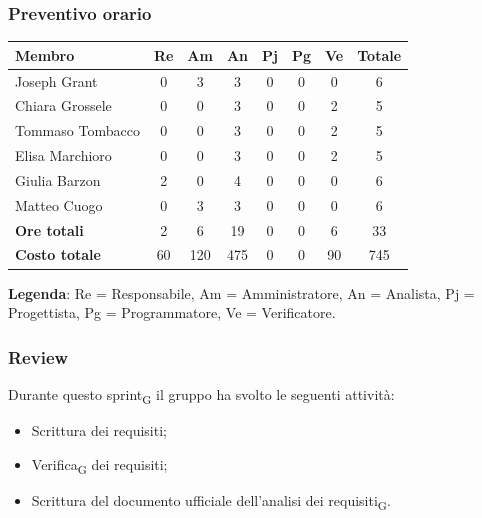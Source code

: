\documentclass[11pt,a4paper]{article}
\newcommand{\gls}[1]{#1\textsubscript{G}}
\begin{document}
\subsubsection{Preventivo orario}
\begin{center}
    \begin{tabular}{|l|c|c|c|c|c|c|c|}
        \hline
        \textbf{Membro} & \textbf{Re} & \textbf{Am} & \textbf{An} & \textbf{Pj} & \textbf{Pg} & \textbf{Ve} & \textbf{Totale} \\
        \hline
        Joseph Grant & 0 & 3 & 3 & 0 & 0 & 0 & 6 \\
        \hline
        Chiara Grossele & 0 & 0 & 3 & 0 & 0 & 2 & 5 \\
        \hline
        Tommaso Tombacco & 0 & 0 & 3 & 0 & 0 & 2 & 5 \\
        \hline
        Elisa Marchioro & 0 & 0 & 3 & 0 & 0 & 2 & 5 \\
        \hline
        Giulia Barzon & 2 & 0 & 4 & 0 & 0 & 0 & 6 \\
        \hline
        Matteo Cuogo & 0 & 3 & 3 & 0 & 0 & 0 & 6 \\
        \hline
        \textbf{Ore totali} & 2 & 6 & 19 & 0 & 0 & 6 & 33 \\
        \hline
        \textbf{Costo totale} & 60 & 120 & 475 & 0 & 0 & 90 & 745 \\
        \hline
    \end{tabular}
\end{center}

\noindent \textbf{Legenda}: Re = Responsabile, Am = Amministratore, An = Analista, Pj = Progettista, Pg = Programmatore, Ve = Verificatore.

\subsubsection{Review}
Durante questo \gls{sprint} il gruppo ha svolto le seguenti attività:

\begin{itemize}
        \item Scrittura dei requisiti;
        \item \gls{Verifica} dei requisiti;
        \item Scrittura del documento ufficiale dell'\gls{analisi dei requisiti}.
    \end{itemize}
\end{document}
